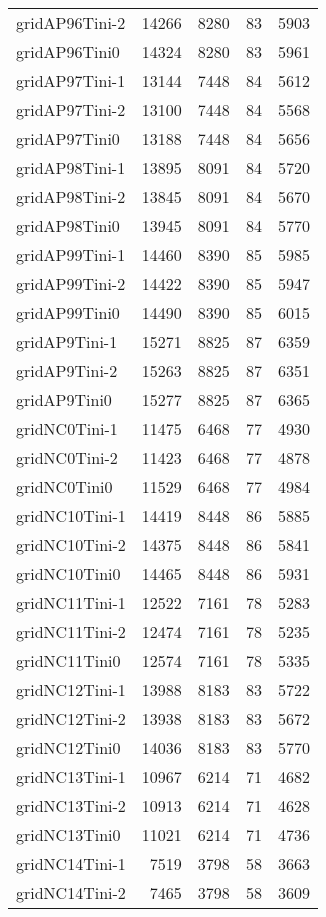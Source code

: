 \begin{longtable}{lrrrr}
gridAP96Tini-2 & 14266 & 8280 & 83 & 5903 \\
gridAP96Tini0 & 14324 & 8280 & 83 & 5961 \\
gridAP97Tini-1 & 13144 & 7448 & 84 & 5612 \\
gridAP97Tini-2 & 13100 & 7448 & 84 & 5568 \\
gridAP97Tini0 & 13188 & 7448 & 84 & 5656 \\
gridAP98Tini-1 & 13895 & 8091 & 84 & 5720 \\
gridAP98Tini-2 & 13845 & 8091 & 84 & 5670 \\
gridAP98Tini0 & 13945 & 8091 & 84 & 5770 \\
gridAP99Tini-1 & 14460 & 8390 & 85 & 5985 \\
gridAP99Tini-2 & 14422 & 8390 & 85 & 5947 \\
gridAP99Tini0 & 14490 & 8390 & 85 & 6015 \\
gridAP9Tini-1 & 15271 & 8825 & 87 & 6359 \\
gridAP9Tini-2 & 15263 & 8825 & 87 & 6351 \\
gridAP9Tini0 & 15277 & 8825 & 87 & 6365 \\
gridNC0Tini-1 & 11475 & 6468 & 77 & 4930 \\
gridNC0Tini-2 & 11423 & 6468 & 77 & 4878 \\
gridNC0Tini0 & 11529 & 6468 & 77 & 4984 \\
gridNC10Tini-1 & 14419 & 8448 & 86 & 5885 \\
gridNC10Tini-2 & 14375 & 8448 & 86 & 5841 \\
gridNC10Tini0 & 14465 & 8448 & 86 & 5931 \\
gridNC11Tini-1 & 12522 & 7161 & 78 & 5283 \\
gridNC11Tini-2 & 12474 & 7161 & 78 & 5235 \\
gridNC11Tini0 & 12574 & 7161 & 78 & 5335 \\
gridNC12Tini-1 & 13988 & 8183 & 83 & 5722 \\
gridNC12Tini-2 & 13938 & 8183 & 83 & 5672 \\
gridNC12Tini0 & 14036 & 8183 & 83 & 5770 \\
gridNC13Tini-1 & 10967 & 6214 & 71 & 4682 \\
gridNC13Tini-2 & 10913 & 6214 & 71 & 4628 \\
gridNC13Tini0 & 11021 & 6214 & 71 & 4736 \\
gridNC14Tini-1 & 7519 & 3798 & 58 & 3663 \\
gridNC14Tini-2 & 7465 & 3798 & 58 & 3609 \\

\end{longtable}

